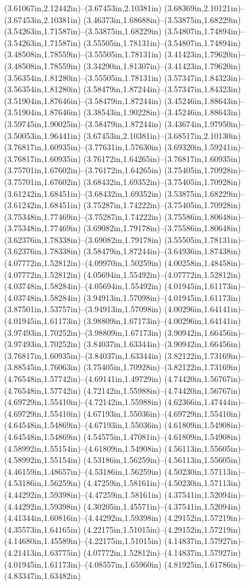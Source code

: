 (3.61067in,2.12442in)--(3.67453in,2.10381in) (3.68369in,2.10121in)--(3.67453in,2.10381in) (3.46373in,1.68688in)--(3.53875in,1.68229in) (3.54263in,1.71587in)--(3.53875in,1.68229in) (3.54807in,1.74894in)--(3.54263in,1.71587in) (3.55505in,1.78131in)--(3.54807in,1.74894in) (3.48508in,1.78559in)--(3.55505in,1.78131in) (3.41423in,1.79620in)--(3.48508in,1.78559in) (3.34290in,1.81307in)--(3.41423in,1.79620in) (3.56354in,1.81280in)--(3.55505in,1.78131in) (3.57347in,1.84323in)--(3.56354in,1.81280in) (3.58479in,1.87244in)--(3.57347in,1.84323in) (3.51904in,1.87646in)--(3.58479in,1.87244in) (3.45246in,1.88643in)--(3.51904in,1.87646in) (3.38543in,1.90228in)--(3.45246in,1.88643in) (3.59745in,1.90025in)--(3.58479in,1.87244in) (3.43674in,1.97950in)--(3.50053in,1.96441in) (3.67453in,2.10381in)--(3.68517in,2.10130in) (3.76817in,1.60935in)--(3.77631in,1.57630in) (3.69320in,1.59241in)--(3.76817in,1.60935in) (3.76172in,1.64265in)--(3.76817in,1.60935in) (3.75701in,1.67602in)--(3.76172in,1.64265in) (3.75405in,1.70928in)--(3.75701in,1.67602in) (3.68432in,1.69352in)--(3.75405in,1.70928in) (3.61242in,1.68451in)--(3.68432in,1.69352in) (3.53875in,1.68229in)--(3.61242in,1.68451in) (3.75287in,1.74222in)--(3.75405in,1.70928in) (3.75348in,1.77469in)--(3.75287in,1.74222in) (3.75586in,1.80648in)--(3.75348in,1.77469in) (3.69082in,1.79178in)--(3.75586in,1.80648in) (3.62376in,1.78338in)--(3.69082in,1.79178in) (3.55505in,1.78131in)--(3.62376in,1.78338in) (3.58479in,1.87244in)--(3.64936in,1.87438in) (4.07772in,1.52812in)--(4.09970in,1.50259in) (4.00258in,1.48458in)--(4.07772in,1.52812in) (4.05694in,1.55492in)--(4.07772in,1.52812in) (4.03748in,1.58284in)--(4.05694in,1.55492in) (4.01945in,1.61173in)--(4.03748in,1.58284in) (3.94913in,1.57098in)--(4.01945in,1.61173in) (3.87501in,1.53757in)--(3.94913in,1.57098in) (4.00296in,1.64141in)--(4.01945in,1.61173in) (3.98809in,1.67173in)--(4.00296in,1.64141in) (3.97493in,1.70252in)--(3.98809in,1.67173in) (3.90942in,1.66456in)--(3.97493in,1.70252in) (3.84037in,1.63344in)--(3.90942in,1.66456in) (3.76817in,1.60935in)--(3.84037in,1.63344in) (3.82122in,1.73169in)--(3.88545in,1.76063in) (3.75405in,1.70928in)--(3.82122in,1.73169in) (4.76548in,1.57742in)--(4.69141in,1.49729in) (4.74420in,1.56767in)--(4.76548in,1.57742in) (4.72142in,1.55988in)--(4.74420in,1.56767in) (4.69729in,1.55410in)--(4.72142in,1.55988in) (4.62366in,1.47444in)--(4.69729in,1.55410in) (4.67193in,1.55036in)--(4.69729in,1.55410in) (4.64548in,1.54869in)--(4.67193in,1.55036in) (4.61809in,1.54908in)--(4.64548in,1.54869in) (4.54575in,1.47081in)--(4.61809in,1.54908in) (4.58992in,1.55154in)--(4.61809in,1.54908in) (4.56113in,1.55605in)--(4.58992in,1.55154in) (4.53186in,1.56259in)--(4.56113in,1.55605in) (4.46159in,1.48657in)--(4.53186in,1.56259in) (4.50230in,1.57113in)--(4.53186in,1.56259in) (4.47259in,1.58161in)--(4.50230in,1.57113in) (4.44292in,1.59398in)--(4.47259in,1.58161in) (4.37541in,1.52094in)--(4.44292in,1.59398in) (4.30205in,1.45571in)--(4.37541in,1.52094in) (4.41344in,1.60816in)--(4.44292in,1.59398in) (4.29152in,1.57219in)--(4.35573in,1.64165in) (4.22175in,1.51015in)--(4.29152in,1.57219in) (4.14680in,1.45589in)--(4.22175in,1.51015in) (4.14837in,1.57927in)--(4.21413in,1.63775in) (4.07772in,1.52812in)--(4.14837in,1.57927in) (4.01945in,1.61173in)--(4.08557in,1.65960in) (4.81925in,1.61786in)--(4.83347in,1.63482in) 